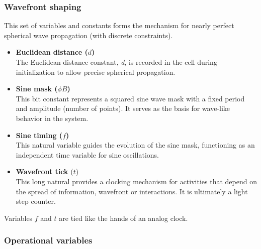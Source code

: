 \documentclass[12pt]{article}
\begin{document}
\subsubsection{Wavefront shaping}
This set of variables and constants forms the mechanism for nearly perfect spherical wave propagation (with discrete constraints).
\begin{itemize}
    \item \textbf{Euclidean distance ($d$)} \\
    The Euclidean distance constant, \emph{d}, is recorded in the cell during initialization to allow precise spherical propagation.
    
    \item \textbf{Sine mask ($\phi B$)} \\
    This bit constant represents a squared sine wave mask with a fixed period and amplitude (number of points). It serves as the basis for wave-like behavior in the system.
    
    \item \textbf{Sine timing ($f$)} \\
    This natural variable guides the evolution of the sine mask, functioning as an independent time variable for sine oscillations.

    \item \textbf{Wavefront tick} ($t$)\\
     This long natural provides a clocking mechanism for activities that depend on the spread of information, wavefront or interactions. It is ultimately a light step counter. 
 
\end{itemize}

Variables $f$ and $t$ are tied like the hands of an analog clock.
 
\subsubsection{Operational variables}
\end{document}

